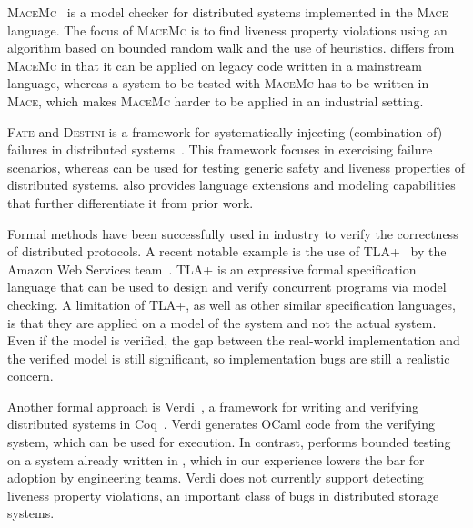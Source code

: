 \textsc{MaceMc}~\cite{killian2007life} is a model checker for distributed systems implemented in the \textsc{Mace} language. The focus of \textsc{MaceMc} is to find liveness property violations using an algorithm based on bounded random walk and the use of heuristics. \psharp differs from \textsc{MaceMc} in that it can be applied on legacy code written in a mainstream language, whereas a system to be tested with \textsc{MaceMc} has to be written in \textsc{Mace}, which makes \textsc{MaceMc} harder to be applied in an industrial setting.

\textsc{Fate} and \textsc{Destini} is a framework for systematically injecting (combination of) failures in distributed systems~\cite{gunawi2011fate}. This framework focuses in exercising failure scenarios, whereas \psharp can be used for testing generic safety and liveness properties of distributed systems. \psharp also provides language extensions and modeling capabilities that further differentiate it from prior work.

Formal methods have been successfully used in industry to verify the correctness of distributed protocols. A recent notable example is the use of TLA+~\cite{lamport1994temporal} by the Amazon Web Services team~\cite{newcombe2015aws}. TLA+ is an expressive formal specification language that can be used to design and verify concurrent programs via model checking. A limitation of TLA+, as well as other similar specification languages, is that they are applied on a model of the system and not the actual system. Even if the model is verified, the gap between the real-world implementation and the verified model is still significant, so implementation bugs are still a realistic concern.

Another formal approach is Verdi~\cite{wilcox2015verdi}, a framework for writing and verifying distributed systems in Coq~\cite{barras1997coq}. Verdi generates OCaml code from the verifying system, which can be used for execution. In contrast, \psharp performs bounded testing on a system already written in \csharp, which in our experience lowers the bar for adoption by engineering teams. Verdi does not currently support detecting liveness property violations, an important class of bugs in distributed storage systems.
